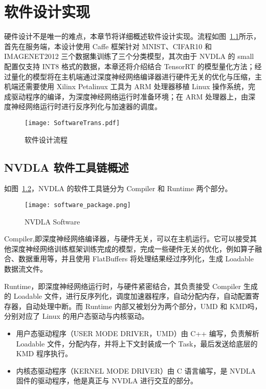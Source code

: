 \chapter{软件设计实现}\label{chap:software}

硬件设计不是唯一的难点，本章节将详细概述软件设计实现。流程如图~\ref{fig:Software Transplant}所示，首先在服务端，本设计使用 Caffe 框架针对 MNIST、CIFAR10 和 IMAGENET2012 三个数据集训练了三个分类模型，其次由于 NVDLA 的 small 配置仅支持 INT8 格式的数据，本章还将介绍结合 TensorRT 的模型量化方法；经过量化的模型将在主机端通过深度神经网络编译器进行硬件无关的优化与压缩，主机端还需要使用 Xilinx Petalinux 工具为 ARM 处理器移植 Linux 操作系统，完成驱动程序的编译，为深度神经网络运行时准备环境；在 ARM 处理器上，由深度神经网络运行时进行反序列化与加速器的调度。

\begin{figure}[!htbp]
    \centering
    \texttt{[image: SoftwareTrans.pdf]}
    \caption{软件设计流程}
    \label{fig:Software Transplant}
\end{figure}

\section{NVDLA 软件工具链概述}

如图~\ref{fig:NVDLA Software}，NVDLA 的软件工具链分为 Compiler 和 Runtime 两个部分。

\begin{figure}[!htbp]
    \centering
    \texttt{[image: software\_package.png]}
    \caption{NVDLA Software}
    \label{fig:NVDLA Software}
\end{figure}

Compiler,即深度神经网络编译器，与硬件无关，可以在主机运行。它可以接受其他深度神经网络训练框架训练完成的模型，完成一些硬件无关的优化，例如算子融合、数据重用等，并且使用 FlatBuffers 将处理结果经过序列化，生成 Loadable 数据流文件。

Runtime，即深度神经网络运行时，与硬件紧密结合，其负责接受 Compiler 生成的 Loadable 文件，进行反序列化，调度加速器程序，自动分配内存，自动配置寄存器，自动处理中断。而 Runtime 内部又被划分为两个部分，UMD 和 KMD吗，分别对应了 Linux 的用户态驱动与内核驱动。

\begin{itemize}
    \item 用户态驱动程序（USER MODE DRIVER，UMD）由 C++ 编写，负责解析 Loadable 文件，分配内存，并将上下文封装成一个 Task，最后发送给底层的 KMD 程序执行。
    \item 内核态驱动程序（KERNEL MODE DRIVER）由 C 语言编写，是 NVDLA 固件的驱动程序，他是真正与 NVDLA 进行交互的部分。
\end{itemize}

